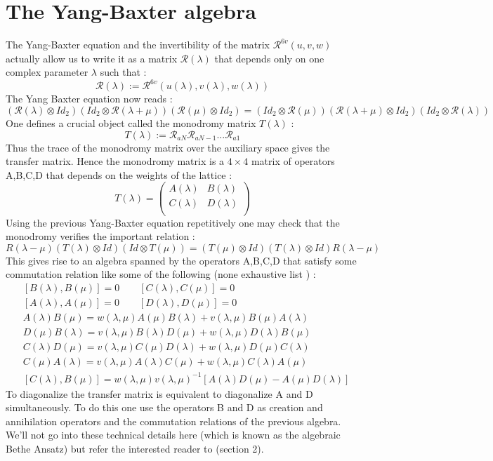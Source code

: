 \documentclass{article}
\theoremstyle{definition}
\begin{document}
\section{The Yang-Baxter algebra} The Yang-Baxter equation and the invertibility of the matrix $\mathcal{R}^{6v}(u,v,w)$ actually allow us to write it as a matrix $\mathcal{R}(\lambda)$ that depends only on one complex parameter $\lambda$ such that :$$\mathcal{R}(\lambda):=\mathcal{R}^{6v}(u(\lambda),v(\lambda),w(\lambda))$$ The Yang Baxter equation now reads : $$(\mathcal{R}(\lambda)\otimes Id_2)(Id_2\otimes\mathcal{R}(\lambda+\mu))(\mathcal{R}(\mu)\otimes Id_2)=(Id_2\otimes\mathcal{R}(\mu))(\mathcal{R}(\lambda+\mu)\otimes Id_2)(Id_2\otimes\mathcal{R}(\lambda))$$ One defines a crucial object called the monodromy matrix  $T(\lambda)$ : $$T(\lambda):=\mathcal{R}_{aN}\mathcal{R}_{aN-1}...\mathcal{R}_{a1}$$
Thus the trace of the monodromy matrix over the auxiliary space gives the transfer matrix. Hence the monodromy matrix is a $4\times 4$ matrix of operators A,B,C,D that depends on the weights of the lattice : \begin{equation}
T(\lambda)=\begin{pmatrix}
A(\lambda) & B(\lambda)\\
C(\lambda) & D(\lambda) \\
\end{pmatrix}
\end{equation}
Using the previous Yang-Baxter equation repetitively one may check that the monodromy verifies the important relation : \begin{equation}\label{YBmono}
R(\lambda-\mu)(T(\lambda)\otimes Id)(Id\otimes T(\mu))=(T(\mu)\otimes Id)(T(\lambda)\otimes Id) R(\lambda-\mu)
\end{equation} This gives rise to an algebra spanned by the operators A,B,C,D that satisfy some commutation relation like some of the following (none exhaustive list ) : \begin{align}
&[B(\lambda),B(\mu)]=0\qquad [C(\lambda),C(\mu)]=0\\
&[A(\lambda),A(\mu)]=0\qquad [D(\lambda),D(\mu)]=0\\
&A(\lambda)B(\mu)=w(\lambda,\mu)A(\mu)B(\lambda)+v(\lambda,\mu)B(\mu)A(\lambda)\\
&D(\mu)B(\lambda)=v(\lambda,\mu)B(\lambda)D(\mu)+w(\lambda,\mu)D(\lambda)B(\mu)\\
&C(\lambda)D(\mu)=v(\lambda,\mu)C(\mu)D(\lambda)+w(\lambda,\mu)D(\mu)C(\lambda)\\
&C(\mu)A(\lambda)=v(\lambda,\mu)A(\lambda)C(\mu)+w(\lambda,\mu)C(\lambda)A(\mu)\\
&[C(\lambda),B(\mu)]=w(\lambda,\mu)v(\lambda,\mu)^{-1}[A(\lambda)D(\mu)-A(\mu)D(\lambda)]
\end{align} To diagonalize the transfer matrix is equivalent to diagonalize A and D simultaneously. To do this one use the operators B and D as creation and annihilation operators and the commutation relations of the previous algebra. We'll not go into these technical details here (which is known as the algebraic Bethe Ansatz)  but refer the interested reader to \cite{GomezRuizSierra}(section 2).
\end{document}
